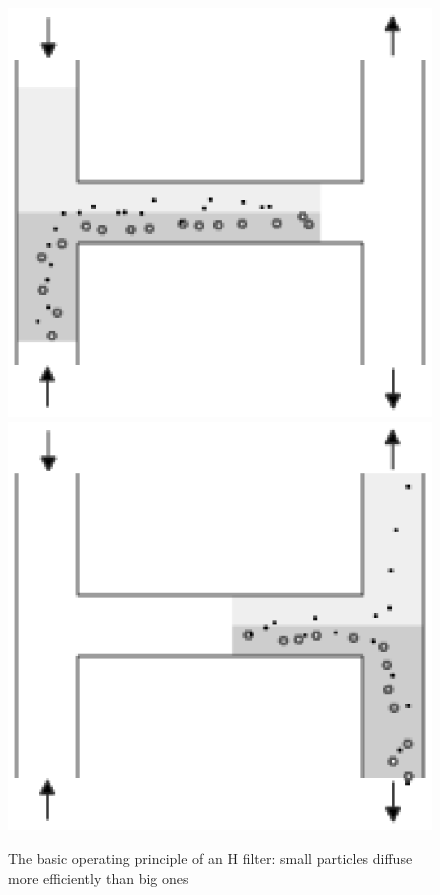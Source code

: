 \documentclass[12pt]{article}
\begin{document}
\begin{figure}[htcb]
\begin{center}
 	\includegraphics{h_filter.eps}
	\includegraphics{h_filter2.eps}
	\caption{The basic operating principle of an H filter: small particles diffuse more efficiently than big ones}
	\label{fig:h_filter}
\end{center}
\end{figure}
\end{document}
